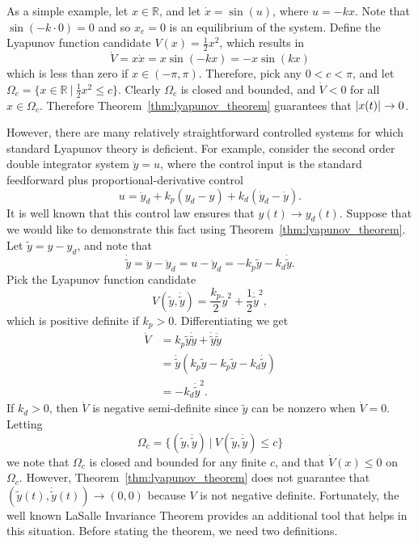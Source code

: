 As a simple example, let $x\in\mathbb{R}$, and let $\dot{x}=\sin(u)$, where $u=-kx$.  Note that $\sin(-k\cdot 0)=0$ and so $x_e=0$ is an equilibrium of the system.  Define the Lyapunov function candidate $V(x) = \frac{1}{2}x^2$, which results in 
\[
\dot{V} = x\dot{x} = x\sin(-kx) = -x\sin(kx)
\]
which is less than zero if $x\in (-\pi, \pi)$.  Therefore, pick any $0<c<\pi$, and let $\Omega_c = \{x\in\mathbb{R}  ~|~ \frac{1}{2}x^2 \leq c\}$.  Clearly $\Omega_c$ is closed and bounded, and $\dot{V}<0$ for all $x\in\Omega_c$.  Therefore Theorem~\ref{thm:lyapunov_theorem} guarantees that $\left|x(t)\right|\to 0$.

However, there are many relatively straightforward controlled systems for which standard Lyapunov theory is deficient.  For example, consider the second order double integrator system 
$\ddot{y}=u$,
where the control input is the standard feedforward plus proportional-derivative control
\[
u = \ddot{y}_d + k_p(y_d-y) + k_d(\dot{y}_d-\dot{y}).
\]
It is well known that this control law ensures that $y(t)\to y_d(t)$.  Suppose that we would like to demonstrate this fact using Theorem~\ref{thm:lyapunov_theorem}.  Let $\tilde{y} = y-y_d$, and note that
\begin{equation}\label{eq:double_integrator_lasalle}
\dot{\tilde{y}} = \ddot{y}-\ddot{y}_d = u - \ddot{y}_d = -k_p\tilde{y} - k_d\dot{\tilde{y}}.
\end{equation}
Pick the Lyapunov function candidate
\[
V(\tilde{y},\dot{\tilde{y}}) = \frac{k_p}{2}\tilde{y}^2 + \frac{1}{2}\dot{\tilde{y}}^2,
\]
which is positive definite if $k_p>0$.  Differentiating we get
\begin{align*}
\dot{V} &= k_p \tilde{y}\dot{\tilde{y}} + \dot{\tilde{y}}\ddot{\tilde{y}} \\
 	&= \dot{\tilde{y}}\left( k_p	\tilde{y} - k_p\tilde{y} - k_d\dot{\tilde{y}} \right) \\
 	&= - k_d \dot{\tilde{y}}^2.
\end{align*}
If $k_d>0$, then $\dot{V}$ is negative semi-definite since $\tilde{y}$ can be nonzero when $\dot{V}=0$.  Letting 
\[
\Omega_c = \{ (\tilde{y}, \dot{\tilde{y}}) ~|~ V(\tilde{y},\dot{\tilde{y}}) \leq c \}
\]
we note that $\Omega_c$ is closed and bounded for any finite $c$, and that $\dot{V}(x)\leq 0$ on $\Omega_c$.  However, Theorem~\ref{thm:lyapunov_theorem} does not guarantee that $(\tilde{y}(t),\dot{\tilde{y}}(t))\to (0,0)$ because $V$ is not negative definite.  
%
Fortunately, the well known LaSalle Invariance Theorem provides an additional tool that helps in this situation. Before stating the theorem, we need two definitions.
